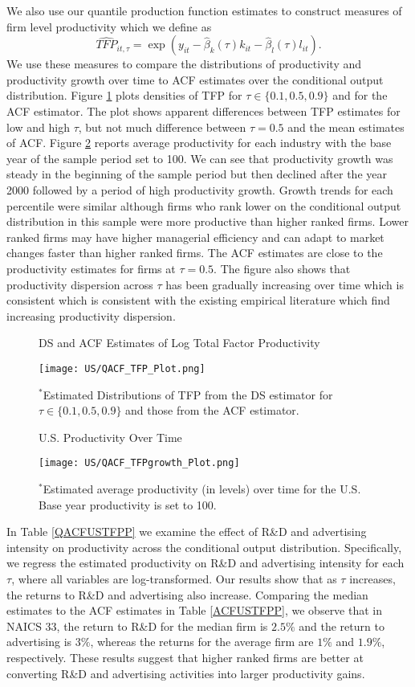 \documentclass[12pt]{article}
\begin{document}
We also use our quantile production function estimates to construct measures of firm level productivity which we define as
\begin{equation}
\widehat{TFP}_{it,\tau}=\exp(y_{it}-\hat{\beta}_{k}(\tau)k_{it}-\hat{\beta}_{l}(\tau)l_{it}).
\end{equation}
We use these measures to compare the distributions of productivity and productivity growth over time to ACF estimates over the conditional output distribution. Figure \ref{fig:QACFUSTFP} plots densities of TFP for $\tau \in \{0.1, 0.5, 0.9\}$ and for the ACF estimator. The plot shows apparent differences between TFP estimates for low and high $\tau$, but not much difference between $\tau=0.5$ and the mean estimates of ACF. Figure \ref{fig:QACFUSTFPG} reports average productivity for each industry with the base year of the sample period set to 100. We can see that productivity growth was steady in the beginning of the sample period but then declined after the year 2000 followed by a period of high productivity growth. Growth trends for each percentile were similar although firms who rank lower on the conditional output distribution in this sample were more productive than higher ranked firms. Lower ranked firms may have higher managerial efficiency and can adapt to market changes faster than higher ranked firms. The ACF estimates are close to the productivity estimates for firms at $\tau=0.5$. The figure also shows that productivity dispersion across $\tau$ has been gradually increasing over time which is consistent which is consistent with the existing empirical literature which find increasing productivity dispersion.
\begin{figure}[H]
\centering
\caption{DS and ACF Estimates of Log Total Factor Productivity}
\texttt{[image: US/QACF\_TFP\_Plot.png]}
\caption*{\footnotesize $^{*}$Estimated Distributions of TFP from the DS estimator for $\tau \in \{0.1, 0.5, 0.9\}$ and those from  the ACF estimator.}
\label{fig:QACFUSTFP}
\end{figure}

\begin{figure}[H]
\centering
\caption{U.S. Productivity Over Time}
\texttt{[image: US/QACF\_TFPgrowth\_Plot.png]}
\caption*{\footnotesize $^{*}$Estimated average productivity (in levels) over time for the U.S. Base year productivity is set to 100.}
\label{fig:QACFUSTFPG}
\end{figure}

In Table \ref{QACFUSTFPP} we examine the effect of R\&D and advertising intensity on productivity across the conditional output distribution. Specifically, we regress the estimated productivity on R\&D and advertising intensity for each $\tau$, where all variables are log-transformed. Our results show that as $\tau$ increases, the returns to R\&D and advertising also increase. Comparing the median estimates to the ACF estimates in Table \ref{ACFUSTFPP}, we observe that in NAICS 33, the return to R\&D for the median firm is $2.5\%$ and the return to advertising is $3\%$, whereas the returns for the average firm are $1\%$ and $1.9\%$, respectively. These results suggest that higher ranked firms are better at converting R\&D and advertising activities into larger productivity gains. 
\end{document}
